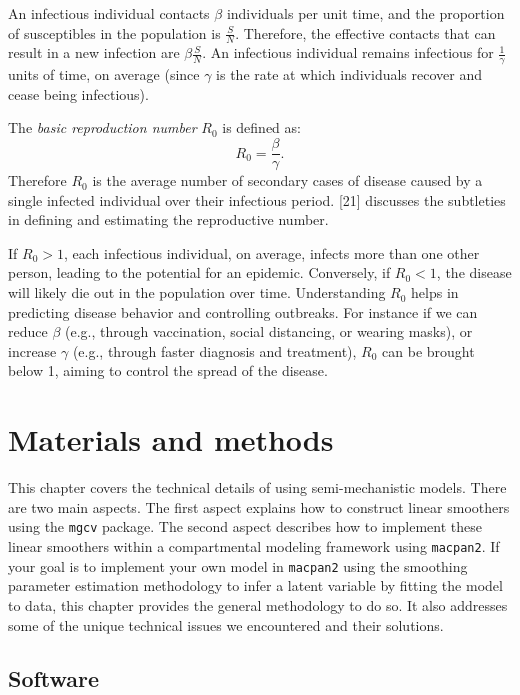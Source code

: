 \documentclass[
11pt, %
oneside, %
english, %
singlespacing, %
]{macthesis} %
\begin{document}
An infectious individual contacts \(\beta\) individuals per unit time, and the proportion of susceptibles in the population is \(\frac{S}{N}\). Therefore, the effective contacts that can result in a new infection are \(\beta \frac{S}{N}\). An infectious individual remains infectious for \(\frac{1}{\gamma}\) units of time, on average (since \(\gamma\) is the rate at which individuals recover and cease being infectious).

The \emph{basic reproduction number} \(R_0\) is defined as:
\[
   R_0 = \frac{\beta}{\gamma}.
   \]
Therefore \(R_0\) is the average number of secondary cases of disease caused by a single infected individual over their infectious period. {[}21{]} discusses the subtleties in defining and estimating the reproductive number.

If \(R_0 > 1\), each infectious individual, on average, infects more than one other person, leading to the potential for an epidemic. Conversely, if \(R_0 < 1\), the disease will likely die out in the population over time. Understanding \(R_0\) helps in predicting disease behavior and controlling outbreaks. For instance if we can reduce \(\beta\) (e.g., through vaccination, social distancing, or wearing masks), or increase \(\gamma\) (e.g., through faster diagnosis and treatment), \(R_0\) can be brought below 1, aiming to control the spread of the disease.

\chapter{Materials and methods}\label{Materials-and-methods}

This chapter covers the technical details of using semi-mechanistic models. There are two main aspects. The first aspect explains how to construct linear smoothers using the \texttt{mgcv} package. The second aspect describes how to implement these linear smoothers within a compartmental modeling framework using \texttt{macpan2}. If your goal is to implement your own model in \texttt{macpan2} using the smoothing parameter estimation methodology to infer a latent variable by fitting the model to data, this chapter provides the general methodology to do so. It also addresses some of the unique technical issues we encountered and their solutions.

\section{Software}\label{Software}
\end{document}

